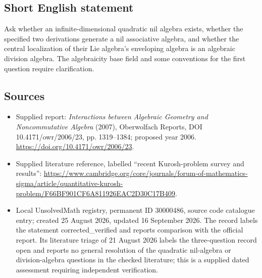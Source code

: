 \documentclass[11pt]{article}
\begin{document}
\subsection{Short English statement}
Ask whether an infinite-dimensional quadratic nil algebra exists, whether the specified two derivations generate a nil associative algebra, and whether the central localization of their Lie algebra's enveloping algebra is an algebraic division algebra. The algebraicity base field and some conventions for the first question require clarification.
\subsection{Sources}
\begin{itemize}
\item Supplied report: \emph{Interactions between Algebraic Geometry and Noncommutative Algebra} (2007), Oberwolfach Reports, DOI 10.4171/owr/2006/23, pp. 1319--1384; proposed year 2006. \url{https://doi.org/10.4171/owr/2006/23}.
\item Supplied literature reference, labelled ``recent Kurosh-problem survey and results'': \url{https://www.cambridge.org/core/journals/forum-of-mathematics-sigma/article/quantitative-kurosh-problem/F66BF901CF6A811926EAC2D30C17B409}.
\item Local UnsolvedMath registry, permanent ID 30000486, source code catalogue entry; created 25 August 2026, updated 16 September 2026. The record labels the statement corrected\_verified and reports comparison with the official report. Its literature triage of 21 August 2026 labels the three-question record open and reports no general resolution of the quadratic nil-algebra or division-algebra questions in the checked literature; this is a supplied dated assessment requiring independent verification.
\end{itemize}
\end{document}
